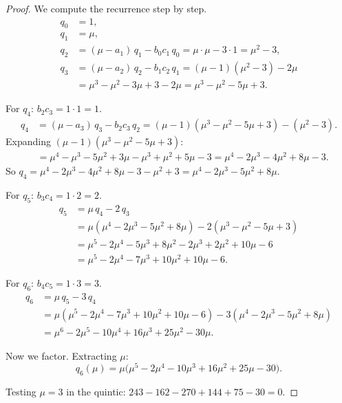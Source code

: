 \documentclass[11pt,a4paper]{article}
\theoremstyle{plain}
\theoremstyle{definition}
\begin{document}
\begin{proof}
We compute the recurrence step by step.
\begin{align*}
  q_0 &= 1, \\
  q_1 &= \mu, \\
  q_2 &= (\mu - a_1)\,q_1 - b_0 c_1\,q_0
       = \mu \cdot \mu - 3 \cdot 1 = \mu^2 - 3, \\
  q_3 &= (\mu - a_2)\,q_2 - b_1 c_2\,q_1
       = (\mu - 1)(\mu^2 - 3) - 2\mu \\
      &= \mu^3 - \mu^2 - 3\mu + 3 - 2\mu
       = \mu^3 - \mu^2 - 5\mu + 3.
\end{align*}

For $q_4$: $b_2 c_3 = 1 \cdot 1 = 1$.
\begin{align*}
  q_4 &= (\mu - a_3)\,q_3 - b_2 c_3\,q_2
       = (\mu - 1)(\mu^3 - \mu^2 - 5\mu + 3) - (\mu^2 - 3).
\end{align*}
Expanding $(\mu - 1)(\mu^3 - \mu^2 - 5\mu + 3)$:
\begin{align*}
  &= \mu^4 - \mu^3 - 5\mu^2 + 3\mu - \mu^3 + \mu^2 + 5\mu - 3
   = \mu^4 - 2\mu^3 - 4\mu^2 + 8\mu - 3.
\end{align*}
So $q_4 = \mu^4 - 2\mu^3 - 4\mu^2 + 8\mu - 3 - \mu^2 + 3
= \mu^4 - 2\mu^3 - 5\mu^2 + 8\mu$.

For $q_5$: $b_3 c_4 = 1 \cdot 2 = 2$.
\begin{align*}
  q_5 &= \mu\,q_4 - 2\,q_3 \\
      &= \mu(\mu^4 - 2\mu^3 - 5\mu^2 + 8\mu)
         - 2(\mu^3 - \mu^2 - 5\mu + 3) \\
      &= \mu^5 - 2\mu^4 - 5\mu^3 + 8\mu^2
         - 2\mu^3 + 2\mu^2 + 10\mu - 6 \\
      &= \mu^5 - 2\mu^4 - 7\mu^3 + 10\mu^2 + 10\mu - 6.
\end{align*}

For $q_6$: $b_4 c_5 = 1 \cdot 3 = 3$.
\begin{align*}
  q_6 &= \mu\,q_5 - 3\,q_4 \\
      &= \mu(\mu^5 - 2\mu^4 - 7\mu^3 + 10\mu^2 + 10\mu - 6)
         - 3(\mu^4 - 2\mu^3 - 5\mu^2 + 8\mu) \\
      &= \mu^6 - 2\mu^5 - 10\mu^4 + 16\mu^3 + 25\mu^2 - 30\mu.
\end{align*}

Now we factor.  Extracting $\mu$:
\[
  q_6(\mu) = \mu\bigl(\mu^5 - 2\mu^4 - 10\mu^3 + 16\mu^2 + 25\mu - 30\bigr).
\]

Testing $\mu = 3$ in the quintic:
$243 - 162 - 270 + 144 + 75 - 30 = 0$. \checkmark


\end{proof}
\end{document}
